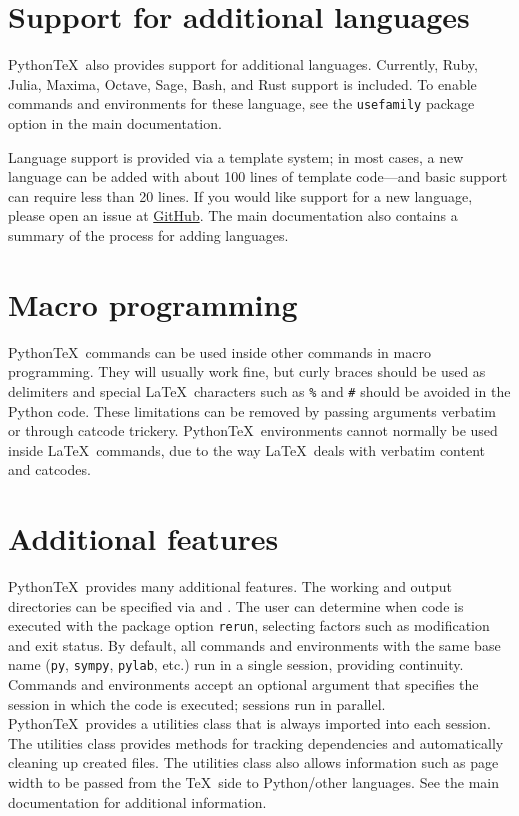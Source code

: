 \documentclass[twocolumn]{article}
\newcommand{\pytex}{Python\TeX}
\begin{document}
{\section*{Support for additional languages}

\pytex\ also provides support for additional languages.  Currently, Ruby, Julia, Maxima, Octave, Sage, Bash, and Rust support is included.  To enable commands and environments for these language, see the \texttt{usefamily} package option in the main documentation.

Language support is provided via a template system; in most cases, a new language can be added with about 100 lines of template code---and basic support can require less than 20 lines.  If you would like support for a new language, please open an issue at \href{https://github.com/gpoore/pythontex}{GitHub}.  The main documentation also contains a summary of the process for adding languages.

\section*{Macro programming}

\pytex\ commands can be used inside other commands in macro programming.  They will usually work fine, but curly braces should be used as delimiters and special \LaTeX\ characters such as \texttt{\%} and \texttt{\#} should be avoided in the Python code.  These limitations can be removed by passing arguments verbatim or through catcode trickery.  \pytex\ environments cannot normally be used inside \LaTeX\ commands, due to the way \LaTeX\ deals with verbatim content and catcodes.


\section*{Additional features}

\pytex\ provides many additional features.  The working and output directories can be specified via  and .  The user can determine when code is executed with the package option \texttt{rerun}, selecting factors such as modification and exit status.  By default, all commands and environments with the same base name (\texttt{py}, \texttt{sympy}, \texttt{pylab}, etc.) run in a single session, providing continuity.  Commands and environments accept an optional argument that specifies the session in which the code is executed; sessions run in parallel.  \pytex\ provides a utilities class that is always imported into each session.  The utilities class provides methods for tracking dependencies and automatically cleaning up created files.  The utilities class also allows information such as page width to be passed from the \TeX\ side to Python/other languages.  See the main documentation for additional information.

}
\end{document}
